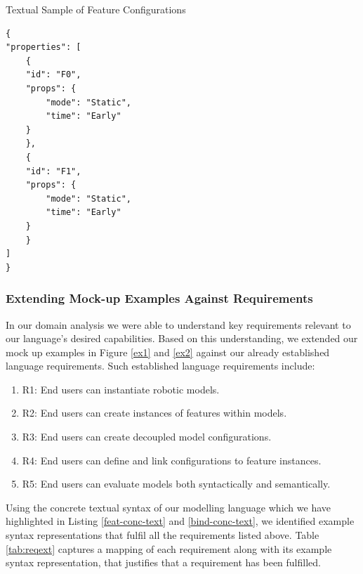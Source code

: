 \documentclass[conference]{IEEEtran}
\begin{document}
\begin{listing}
\caption{Textual Sample of Feature Configurations}
\begin{verbatim}
{
"properties": [
    {
    "id": "F0",
    "props": {
        "mode": "Static",
        "time": "Early"
    }
    },
    {
    "id": "F1",
    "props": {
        "mode": "Static",
        "time": "Early"
    }
    }
]
}
\end{verbatim}
\label{bind-conc-text}
\end{listing}

\subsubsection{Extending Mock-up Examples Against Requirements}
In our domain analysis we were able to understand key requirements relevant to our language's desired capabilities. Based on this understanding, we extended our mock up examples in Figure \ref{ex1} and \ref{ex2} against our already established language requirements. Such established language requirements include:
\begin{enumerate}
    \item R1: End users can instantiate robotic models.
    \item R2: End users can create instances of features within models.
    \item R3: End users can create decoupled model configurations.
    \item R4: End users can define and link configurations to feature instances.
    \item R5: End users can evaluate models both syntactically and semantically.
\end{enumerate}
Using the concrete textual syntax of our modelling language which we have highlighted in Listing \ref{feat-conc-text} and \ref{bind-conc-text}, we identified example syntax representations that fulfil all the requirements listed above. Table \ref{tab:reqext} captures a mapping of each requirement along with its example syntax representation, that justifies that a requirement has been fulfilled.
\end{document}

